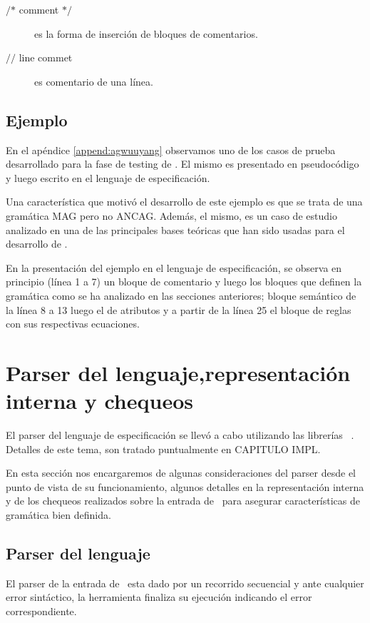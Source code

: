 \begin{description}
\item [$\textbf{/*}$ comment $\textbf{*/}$] es la forma de inserción de bloques de comentarios.
\item [$\textbf{//}$ line commet] es comentario de una línea.
\end{description} 

\subsection{Ejemplo}

En el apéndice \ref{append:agwuuyang} observamos uno de los casos de prueba desarrollado para la fase de testing de \maggen. El mismo es presentado en pseudocódigo y luego escrito en el lenguaje de especificación. 

Una característica que motivó el desarrollo de este ejemplo es que se trata de una gramática MAG pero no ANCAG. Además, el mismo, es un caso de estudio analizado en una de las principales bases teóricas que han sido usadas para el desarrollo de . 

En la presentación del ejemplo en el lenguaje de especificación, se observa en principio (línea 1 a 7) un bloque de comentario y luego los bloques que definen la gramática como se ha analizado en las secciones anteriores; bloque semántico de la línea 8 a 13 luego el de atributos y a partir de la línea 25 el bloque de reglas con sus respectivas ecuaciones.

 
\section{Parser del lenguaje,representación interna y chequeos}
El parser del lenguaje de especificación se llevó a cabo utilizando las librerías \boost\  \spirit. Detalles de este tema, son tratado puntualmente en CAPITULO IMPL. 

En esta sección nos encargaremos de algunas consideraciones del parser desde el punto de vista de su funcionamiento, algunos detalles en la representación interna y de los chequeos realizados sobre la entrada de \maggen\ para asegurar características de gramática bien definida.
\subsection*{Parser del lenguaje}
El parser de la entrada de \maggen\ esta dado por un recorrido secuencial y ante cualquier error sintáctico, la herramienta finaliza su ejecución indicando el error correspondiente. 

